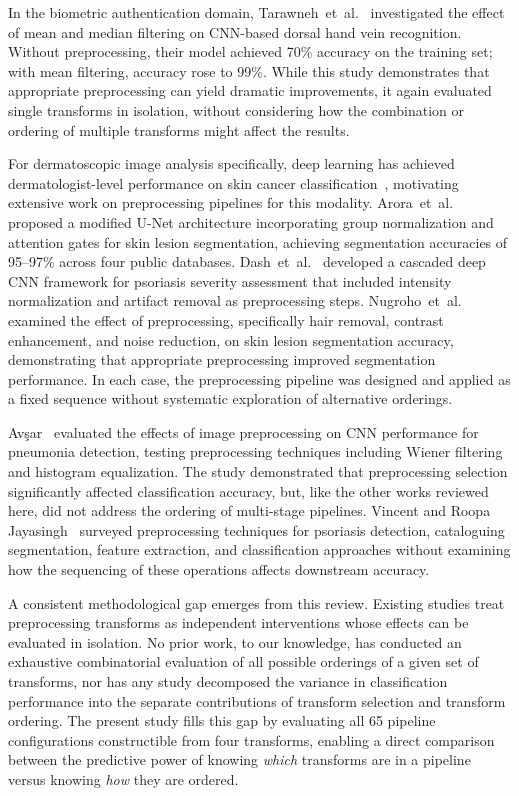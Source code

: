 \documentclass[preprint,5p,times,twocolumn]{elsarticle}
\begin{document}
In the biometric authentication domain, Tarawneh~et~al.~\cite{Tarawneh2024} investigated the effect of mean and median filtering on CNN-based dorsal hand vein recognition. Without preprocessing, their model achieved 70\% accuracy on the training set; with mean filtering, accuracy rose to 99\%. While this study demonstrates that appropriate preprocessing can yield dramatic improvements, it again evaluated single transforms in isolation, without considering how the combination or ordering of multiple transforms might affect the results.

For dermatoscopic image analysis specifically, deep learning has achieved dermatologist-level performance on skin cancer classification~\cite{Esteva2017}, motivating extensive work on preprocessing pipelines for this modality. Arora~et~al.~\cite{ARORA2021102358} proposed a modified U-Net architecture incorporating group normalization and attention gates for skin lesion segmentation, achieving segmentation accuracies of 95--97\% across four public databases. Dash~et~al.~\cite{DASH2020106240} developed a cascaded deep CNN framework for psoriasis severity assessment that included intensity normalization and artifact removal as preprocessing steps. Nugroho~et~al.~\cite{10810559} examined the effect of preprocessing, specifically hair removal, contrast enhancement, and noise reduction, on skin lesion segmentation accuracy, demonstrating that appropriate preprocessing improved segmentation performance. In each case, the preprocessing pipeline was designed and applied as a fixed sequence without systematic exploration of alternative orderings.

Av\c{s}ar~\cite{9548351} evaluated the effects of image preprocessing on CNN performance for pneumonia detection, testing preprocessing techniques including Wiener filtering and histogram equalization. The study demonstrated that preprocessing selection significantly affected classification accuracy, but, like the other works reviewed here, did not address the ordering of multi-stage pipelines. Vincent and Roopa Jayasingh~\cite{9780692} surveyed preprocessing techniques for psoriasis detection, cataloguing segmentation, feature extraction, and classification approaches without examining how the sequencing of these operations affects downstream accuracy.

A consistent methodological gap emerges from this review. Existing studies treat preprocessing transforms as independent interventions whose effects can be evaluated in isolation. No prior work, to our knowledge, has conducted an exhaustive combinatorial evaluation of all possible orderings of a given set of transforms, nor has any study decomposed the variance in classification performance into the separate contributions of transform selection and transform ordering. The present study fills this gap by evaluating all 65 pipeline configurations constructible from four transforms, enabling a direct comparison between the predictive power of knowing \emph{which} transforms are in a pipeline versus knowing \emph{how} they are ordered.
\end{document}
